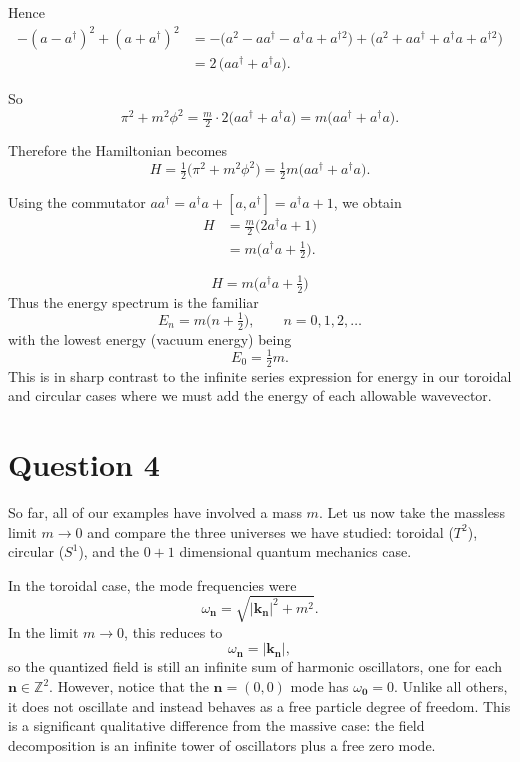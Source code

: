 \documentclass[12pt]{article}
\begin{document}
Hence
\begin{align*}
-(a - a^\dagger)^2 + (a + a^\dagger)^2
&= -\big(a^2 - a a^\dagger - a^\dagger a + a^{\dagger 2}\big)
   + \big(a^2 + a a^\dagger + a^\dagger a + a^{\dagger 2}\big)\\[4pt]
&= 2\,\big(a a^\dagger + a^\dagger a\big).
\end{align*}

So
\[
\pi^2 + m^2\phi^2 = \tfrac{m}{2}\cdot 2\big(a a^\dagger + a^\dagger a\big) = m\big(a a^\dagger + a^\dagger a\big).
\]

Therefore the Hamiltonian becomes
\[
H = \tfrac{1}{2}\big(\pi^2 + m^2\phi^2\big)
  = \tfrac{1}{2} m\big(a a^\dagger + a^\dagger a\big).
\]

Using the commutator \(a a^\dagger = a^\dagger a + [a,a^\dagger] = a^\dagger a + 1\), we obtain
\begin{align*}
H &= \tfrac{m}{2}\big(2 a^\dagger a + 1\big) \\
  &= m\Big(a^\dagger a + \tfrac{1}{2}\Big).
\end{align*}

\[
\boxed{\,H = m\Big(a^\dagger a + \tfrac{1}{2}\Big)\,}
\]
Thus the energy spectrum is the familiar
\[
E_n = m\Big(n+\tfrac{1}{2}\Big), \qquad n=0,1,2,\dots
\]
with the lowest energy (vacuum energy) being
\[
\boxed{E_0 = \tfrac{1}{2}m.}
\]
This is in sharp contrast to the infinite series expression for energy in our
toroidal and circular cases where we must add the energy of each allowable
wavevector.

\section*{Question 4}
So far, all of our examples have involved a mass $m$. 
Let us now take the massless limit $m \to 0$ and compare the three universes 
we have studied: toroidal ($T^2$), circular ($S^1$), and the $0+1$ dimensional 
quantum mechanics case.

\noindent In the toroidal case, the mode frequencies were
\[
\omega_{\mathbf n} = \sqrt{|\mathbf k_{\mathbf n}|^2 + m^2}.
\]
In the limit $m \to 0$, this reduces to
\[
\omega_{\mathbf n} = |\mathbf k_{\mathbf n}|,
\]
so the quantized field is still an infinite sum of harmonic oscillators, one for each
$\mathbf n \in \mathbb Z^2$. However, notice that the $\mathbf n=(0,0)$ mode has 
$\omega_{\mathbf 0}=0$. Unlike all others, it does not oscillate and instead
behaves as a free particle degree of freedom. This is a significant
qualitative difference from the massive case: the field decomposition is an
infinite tower of oscillators plus a free zero mode.
\end{document}
